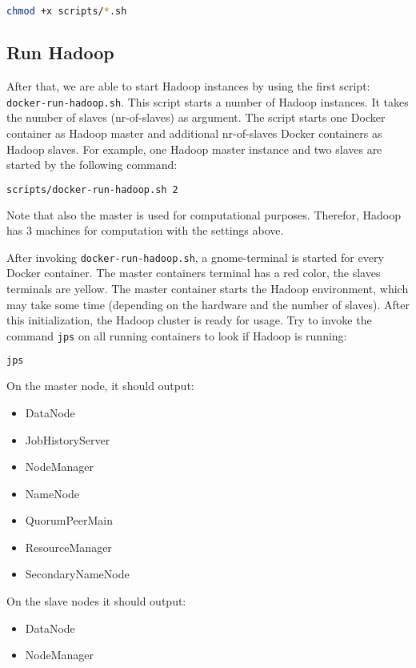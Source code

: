 \begin{lstlisting}[language=bash]
chmod +x scripts/*.sh
\end{lstlisting}

\subsection{Run Hadoop}
After that, we are able to start Hadoop instances by using the first script: \texttt{docker-run-hadoop.sh}. This script starts a number of Hadoop instances. It takes the number of slaves (nr-of-slaves) as argument. The script starts one Docker container as Hadoop master and additional nr-of-slaves Docker containers as Hadoop slaves. For example, one Hadoop master instance and two slaves are started by the following command:

\begin{lstlisting}[language=bash]
scripts/docker-run-hadoop.sh 2
\end{lstlisting}

Note that also the master is used for computational purposes. Therefor, Hadoop has 3 machines for computation with the settings above.

After invoking \texttt{docker-run-hadoop.sh}, a gnome-terminal is started for every Docker container. The master containers terminal has a red color, the slaves terminals are yellow. The master container starts the Hadoop environment, which may take some time (depending on the hardware and the number of slaves). After this initialization, the Hadoop cluster is ready for usage. Try to invoke the command \texttt{jps} on all running containers to look if Hadoop is running:

\begin{lstlisting}[language=bash]
jps
\end{lstlisting}

On the master node, it should output:
\begin{itemize}
  \item DataNode
  \item JobHistoryServer
  \item NodeManager
  \item NameNode
  \item QuorumPeerMain
  \item ResourceManager
  \item SecondaryNameNode
\end{itemize}

On the slave nodes it should output:
\begin{itemize}
  \item DataNode
  \item NodeManager
\end{itemize}

